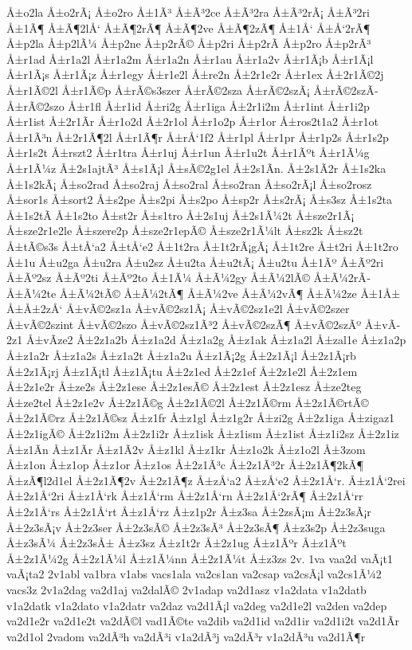 {Å±o2la
Å±o2rÃ¡
Å±o2ro
Å±1Ã³
Å±Ã³2ce
Å±Ã³2ra
Å±Ã³2rÃ¡
Å±Ã³2ri
Å±1Ã¶
Å±Ã¶2lÅ‘
Å±Ã¶2rÃ¶
Å±Ã¶2ve
Å±Ã¶2zÃ¶
Å±1Å‘
Å±Å‘2rÃ¶
Å±p2la
Å±p2lÃ¼
Å±p2ne
Å±p2rÃ©
Å±p2ri
Å±p2rÃ­
Å±p2ro
Å±p2rÃ³
Å±r1ad
Å±r1a2l
Å±r1a2m
Å±r1a2n
Å±r1au
Å±r1a2v
Å±r1Ã¡b
Å±r1Ã¡l
Å±r1Ã¡s
Å±r1Ã¡z
Å±r1egy
Å±r1e2l
Å±re2n
Å±2r1e2r
Å±r1ex
Å±2r1Ã©2j
Å±r1Ã©2l
Å±r1Ã©p
Å±rÃ©s3szer
Å±rÃ©2sza
Å±rÃ©2szÃ¡
Å±rÃ©2szÃ­
Å±rÃ©2szo
Å±r1fl
Å±r1id
Å±ri2g
Å±r1iga
Å±2r1i2m
Å±r1int
Å±r1i2p
Å±r1ist
Å±2r1Ã­r
Å±r1o2d
Å±2r1ol
Å±r1o2p
Å±r1or
Å±ros2t1a2
Å±r1ot
Å±r1Ã³n
Å±2r1Ã¶2l
Å±r1Ã¶r
Å±rÅ‘1f2
Å±r1pl
Å±r1pr
Å±r1p2s
Å±r1s2p
Å±r1s2t
Å±rszt2
Å±r1tra
Å±r1uj
Å±r1un
Å±r1u2t
Å±r1Ãºt
Å±r1Ã¼g
Å±r1Ã¼z
Å±2s1ajtÃ³
Å±s1Ã¡l
Å±sÃ©2g1el
Å±2s1Ã­n.
Å±2s1Ã­2r
Å±1s2ka
Å±1s2kÃ¡
Å±so2rad
Å±so2raj
Å±so2ral
Å±so2ran
Å±so2rÃ¡l
Å±so2rosz
Å±sor1s
Å±sort2
Å±s2pe
Å±s2pi
Å±s2po
Å±sp2r
Å±s2rÃ¡
Å±s3sz
Å±1s2ta
Å±1s2tÃ­
Å±1s2to
Å±st2r
Å±s1tro
Å±2s1uj
Å±2s1Ã¼2t
Å±sze2r1Ã¡
Å±sze2r1e2le
Å±szere2p
Å±sze2r1epÃ©
Å±sze2r1Ã¼lt
Å±sz2k
Å±sz2t
Å±tÃ©s3s
Å±tÅ‘a2
Å±tÅ‘e2
Å±1t2ra
Å±1t2rÃ¡gÃ¡
Å±1t2re
Å±t2ri
Å±1t2ro
Å±1u
Å±u2ga
Å±u2ra
Å±u2sz
Å±u2ta
Å±u2tÃ¡
Å±u2tu
Å±1Ãº
Å±Ãº2ri
Å±Ãº2sz
Å±Ãº2ti
Å±Ãº2to
Å±1Ã¼
Å±Ã¼2gy
Å±Ã¼2lÃ©
Å±Ã¼2rÃ­
Å±Ã¼2te
Å±Ã¼2tÃ©
Å±Ã¼2tÃ¶
Å±Ã¼2ve
Å±Ã¼2vÃ¶
Å±Ã¼2ze
Å±1Å±
Å±Å±2zÅ‘
Å±vÃ©2sz1a
Å±vÃ©2sz1Ã¡
Å±vÃ©2sz1e2l
Å±vÃ©2szer
Å±vÃ©2szint
Å±vÃ©2szo
Å±vÃ©2sz1Ã³2
Å±vÃ©2szÃ¶
Å±vÃ©2szÃº
Å±vÃ­2z1
Å±vÃ­ze2
Å±2z1a2b
Å±z1a2d
Å±z1a2g
Å±z1ak
Å±z1a2l
Å±zal1e
Å±z1a2p
Å±z1a2r
Å±z1a2s
Å±z1a2t
Å±z1a2u
Å±z1Ã¡2g
Å±2z1Ã¡l
Å±2z1Ã¡rb
Å±2z1Ã¡rj
Å±z1Ã¡tl
Å±z1Ã¡tu
Å±2z1ed
Å±2z1ef
Å±2z1e2l
Å±2z1em
Å±2z1e2r
Å±ze2s
Å±2z1ese
Å±2z1esÃ©
Å±2z1est
Å±2z1esz
Å±ze2teg
Å±ze2tel
Å±2z1e2v
Å±2z1Ã©g
Å±2z1Ã©2l
Å±2z1Ã©rm
Å±2z1Ã©rtÃ©
Å±2z1Ã©rz
Å±2z1Ã©sz
Å±z1fr
Å±z1gl
Å±z1g2r
Å±zi2g
Å±2z1iga
Å±zigaz1
Å±2z1igÃ©
Å±2z1i2m
Å±2z1i2r
Å±z1isk
Å±z1ism
Å±z1ist
Å±z1i2sz
Å±2z1iz
Å±z1Ã­n
Å±z1Ã­r
Å±z1Ã­2v
Å±z1kl
Å±z1kr
Å±z1o2k
Å±z1o2l
Å±3zom
Å±z1on
Å±z1op
Å±z1or
Å±z1os
Å±2z1Ã³c
Å±2z1Ã³2r
Å±2z1Ã¶2kÃ¶
Å±zÃ¶l2d1el
Å±2z1Ã¶2v
Å±2z1Ã¶z
Å±zÅ‘a2
Å±zÅ‘e2
Å±2z1Å‘r.
Å±z1Å‘2rei
Å±2z1Å‘2ri
Å±z1Å‘rk
Å±z1Å‘rm
Å±2z1Å‘rn
Å±2z1Å‘2rÃ¶
Å±2z1Å‘rr
Å±2z1Å‘rs
Å±2z1Å‘rt
Å±z1Å‘rz
Å±z1p2r
Å±z3sa
Å±2zsÃ¡m
Å±2z3sÃ¡r
Å±2z3sÃ¡v
Å±2z3ser
Å±2z3sÃ©
Å±2z3sÃ³
Å±2z3sÃ¶
Å±z3s2p
Å±2z3suga
Å±z3sÃ¼
Å±2z3sÅ±
Å±z3sz
Å±z1t2r
Å±2z1ug
Å±z1Ãºr
Å±z1Ãºt
Å±2z1Ã¼2g
Å±2z1Ã¼l
Å±z1Ã¼nn
Å±2z1Ã¼t
Å±z3zs
2v.
1va
vaa2d
vaÃ¡t1
vaÃ¡ta2
2v1abl
va1bra
v1abs
vacs1ala
va2cs1an
va2csap
va2csÃ¡l
va2cs1Ã¼2
vacs3z
2v1a2dag
va2d1aj
va2dalÃ©
2v1adap
va2d1asz
v1a2data
v1a2datb
v1a2datk
v1a2dato
v1a2datr
va2daz
va2d1Ã¡l
va2deg
va2d1e2l
va2den
va2dep
va2d1e2r
va2d1e2t
va2dÃ©l
vad1Ã©te
va2dib
va2d1id
va2d1ir
va2d1i2t
va2d1Ã­r
va2d1ol
2vadom
va2dÃ³h
va2dÃ³i
v1a2dÃ³j
va2dÃ³r
v1a2dÃ³u
va2d1Ã¶r
}
